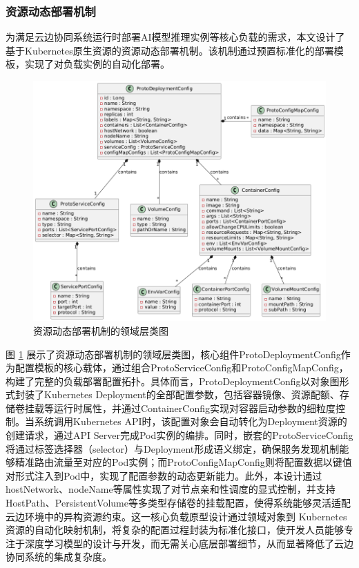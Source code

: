 \subsubsection{资源动态部署机制}
\label{sec:deploy-resource}

为满足云边协同系统运行时部署AI模型推理实例等核心负载的需求，本文设计了基于Kubernetes原生资源的资源动态部署机制。该机制通过预置标准化的部署模板，实现了对负载实例的自动化部署。

\begin{figure}[ht]
  \centering
  \includegraphics[width=\linewidth]{pics/4-11proto.png}
  \caption{资源动态部署机制的领域层类图}
  \label{fig:4-11proto}
\end{figure}

图 \ref{fig:4-11proto} 展示了资源动态部署机制的领域层类图，核心组件ProtoDeploymentConfig作为配置模板的核心载体，通过组合ProtoServiceConfig和ProtoConfigMapConfig，构建了完整的负载部署配置拓扑。具体而言，ProtoDeploymentConfig以对象图形式封装了Kubernetes Deployment的全部配置参数，包括容器镜像、资源配额、存储卷挂载等运行时属性，并通过ContainerConfig实现对容器启动参数的细粒度控制。当系统调用Kubernetes API时，该配置对象会自动转化为Deployment资源的创建请求，通过API Server完成Pod实例的编排。同时，嵌套的ProtoServiceConfig将通过标签选择器（selector）与Deployment形成语义绑定，确保服务发现机制能够精准路由流量至对应的Pod实例；而ProtoConfigMapConfig则将配置数据以键值对形式注入到Pod中，实现了配置参数的动态更新能力。此外，本设计通过hostNetwork、nodeName等属性实现了对节点亲和性调度的显式控制，并支持HostPath、PersistentVolume等多类型存储卷的挂载配置，使得系统能够灵活适配云边环境中的异构资源约束。这一核心负载原型设计通过领域对象到 Kubernetes 资源的自动化映射机制，将复杂的配置过程封装为标准化接口，使开发人员能够专注于深度学习模型的设计与开发，而无需关心底层部署细节，从而显著降低了云边协同系统的集成复杂度。

